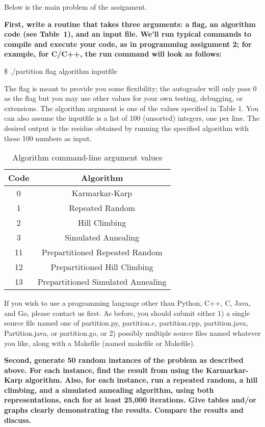 \documentclass[11pt]{article}
\begin{document}
Below is the main problem of the assignment.

\smallskip 
{\bf First, write a routine that takes three arguments: a flag, an algorithm code (see Table~1), and an input file. We'll run typical commands to compile and execute your code, as in programming assignment 2; for example, for C/C++, the run command will look as follows:

\noindent \$ ./partition flag algorithm inputfile 

The flag is meant to provide you some flexibility; the autograder will only pass 0 as the flag but you may use other values for your own testing, debugging, or extensions. The algorithm argument is one of the values specified in Table 1. You can also assume the inputfile is a list of 100 (unsorted) integers, one per line. The desired output is the residue obtained by running the specified algorithm with these 100 numbers as input.}

\begin{table}[h]
    \centering
    \begin{tabular}{|c|c|}
        \hline
        Code & Algorithm \\
        \hline
        0 & Karmarkar-Karp\\
        1 & Repeated Random\\
        2 & Hill Climbing\\
        3 & Simulated Annealing\\
        11 & Prepartitioned Repeated Random\\
        12 & Prepartitioned Hill Climbing\\
        13 & Prepartitioned Simulated Annealing\\
        \hline
    \end{tabular}
    \caption{Algorithm command-line argument values}
    \label{tab:algorithm}
\end{table}

\smallskip 

If you wish to use a programming language other than Python, C++, C, Java, and Go, please contact us first.
As before, you should submit either 1) a single source file named one of partition.py, partition.c, partition.cpp, partition.java, Partition.java, or partition.go, or 2) possibly multiple
source files named whatever you like, along with a Makefile (named makefile or Makefile).

\smallskip 
{\bf Second, generate 50 random instances of the problem as described above.
For each instance, find the result from using the Karmarkar-Karp
algorithm.  Also, for each instance, run a repeated random, a hill
climbing, and a simulated annealing algorithm, using both
representations, each for at least 25,000 iterations.  Give tables and/or
graphs
clearly demonstrating the results.  Compare the
results and discuss.  }
\smallskip 
\end{document}
